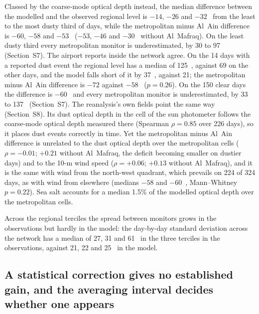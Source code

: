Classed by the coarse-mode
optical depth instead, the median difference between the modelled and the observed regional
level is $-14$, $-26$ and $-32$~\ugm{} from the least to the most dusty third of days, while the
metropolitan minus Al~Ain difference is $-60$, $-58$ and $-53$~\ugm{} ($-53$, $-46$ and
$-30$~\ugm{} without Al~Mafraq). On the least dusty third every metropolitan monitor is
underestimated, by 30 to 97~\ugm{} (Section~S7). The airport reports inside the network agree. On
the 14 days with a reported dust event the regional level has a median of 125~\ugm{}, against 69
on the other days, and the model falls short of it by 37~\ugm{}, against 21; the
metropolitan minus Al~Ain difference is $-72$ against $-58$~\ugm{} ($p=0.26$). On the 150 clear
days the difference is $-60$~\ugm{} and every metropolitan monitor is underestimated, by 33 to
137~\ugm{} (Section~S7). The reanalysis's own fields point the same way
(Section~S8). Its dust optical depth in the cell of the sun photometer follows the coarse-mode
optical depth measured there (Spearman $\rho=0.85$ over 226 days), so it places dust events
correctly in time. Yet the metropolitan minus Al~Ain difference is unrelated to the dust optical
depth over the metropolitan cells ($\rho=-0.01$; $+0.21$ without Al~Mafraq, the deficit becoming
smaller on dustier days) and to the 10-m wind speed ($\rho=+0.06$; $+0.13$ without Al~Mafraq), and
it is the same with wind from the north-west quadrant, which prevails on 224 of 324 days, as with
wind from elsewhere (medians $-58$ and $-60$~\ugm{}, Mann--Whitney $p=0.22$). Sea salt accounts for
a median 1.5\% of the modelled optical depth over the metropolitan cells.

Across the regional terciles the spread between monitors grows in the observations but hardly
in the model: the day-by-day standard
deviation across the network has a median of 27, 31 and 61~\ugm{} in the three terciles in the
observations, against 21, 22 and 25~\ugm{} in the model.

\subsection{A statistical correction gives no established gain, and the averaging interval
decides whether one appears}
\label{sec:res-transfer}


